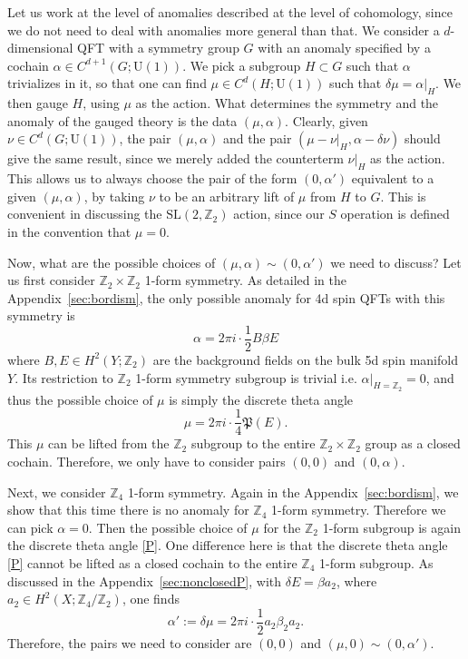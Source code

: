 \documentclass[12pt]{article}
\numberwithin{equation}{section}
\def\bZ{\mathbb{Z}}
\def\fP{\mathfrak{P}}
\def\U{\mathrm{U}}
\def\SL{\mathrm{SL}}
\begin{document}
Let us work at the level of anomalies described at the level of cohomology, since we do not need to deal with anomalies more general than that.
We consider a $d$-dimensional QFT with a symmetry group $G$ with an anomaly specified by a cochain $\alpha\in C^{d+1}(G;\U(1))$. 
We pick a subgroup $H\subset G$ such that $\alpha$ trivializes in it, so that one can find $\mu \in C^d(H;\U(1))$ such that $\delta \mu = \alpha|_H$. 
We then gauge $H$, using $\mu$ as the action.
What determines the symmetry and the anomaly of the gauged theory is the data $(\mu,\alpha)$.
Clearly, given $\nu\in C^d(G;\U(1))$, the pair $(\mu,\alpha)$ and the pair $(\mu-\nu|_H,\alpha-\delta\nu)$ should give the same result, since we merely added the counterterm $\nu|_H$ as the action.
This allows us to always choose the pair of the form $(0,\alpha')$ equivalent to a given $(\mu,\alpha)$, 
by taking $\nu$ to be an arbitrary lift of $\mu$ from $H$ to $G$.
This is convenient in discussing the $\SL(2,\bZ_2)$ action,
since our $S$ operation is defined in the convention that $\mu=0$.

Now, what are the possible choices of $(\mu,\alpha)\sim(0,\alpha')$ we need to discuss?
Let us first consider $\bZ_2\times \bZ_2$ 1-form symmetry.
As detailed in the Appendix~\ref{sec:bordism}, the only possible anomaly for 4d spin QFTs with this symmetry is \begin{equation}
\alpha=2\pi i \cdot \frac12  B\beta E  \label{anom}
\end{equation} where $B,E\in H^2(Y;\bZ_2)$ are the background fields on the bulk 5d spin manifold $Y$.
Its restriction to $\bZ_2$ 1-form symmetry subgroup is trivial i.e. $\alpha|_{H=\bZ_2} = 0$,
and thus the possible choice of $\mu$ is simply the discrete theta angle \begin{equation}
\mu = 2\pi i \cdot \frac14 \fP(E).\label{P}
\end{equation}
This $\mu$ can be lifted from the $\bZ_2$ subgroup to the entire $\bZ_2\times \bZ_2$ group as a closed cochain.
Therefore, we only have to consider pairs $(0,0)$ and $(0,\alpha)$.

Next, we consider $\bZ_4$ 1-form symmetry.
Again in the Appendix~\ref{sec:bordism}, we show that this time there is no anomaly for $\bZ_4$ 1-form symmetry.
Therefore we can pick $\alpha=0$. Then the possible choice of $\mu$ for the $\bZ_2$ 1-form subgroup is again the discrete theta angle \eqref{P}.
One difference here is that the discrete theta angle \eqref{P} cannot be lifted as a closed cochain to the entire $\bZ_4$ 1-form subgroup.
As discussed in the Appendix~\ref{sec:nonclosedP}, with $\delta E=\beta a_2$,
where $a_2\in H^2(X;\bZ_4/\bZ_2)$,
one finds \begin{equation}
\alpha':=\delta \mu = 2\pi i \cdot \frac12 a_2 \beta_2 a_2.\label{anom'}
\end{equation}
Therefore, the pairs we need to consider are $(0,0)$ and $(\mu,0)\sim (0,\alpha')$. 
\end{document}
